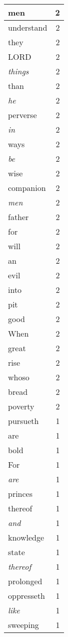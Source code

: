 \begin{center}
\begin{longtable}{l|r}
men & 2\\ \hline 
understand & 2\\ \hline 
they & 2\\ \hline 
LORD & 2\\ \hline 
\emph{things} & 2\\ \hline 
than & 2\\ \hline 
\emph{he} & 2\\ \hline 
perverse & 2\\ \hline 
\emph{in} & 2\\ \hline 
ways & 2\\ \hline 
\emph{be} & 2\\ \hline 
wise & 2\\ \hline 
companion & 2\\ \hline 
\emph{men} & 2\\ \hline 
father & 2\\ \hline 
for & 2\\ \hline 
will & 2\\ \hline 
an & 2\\ \hline 
evil & 2\\ \hline 
into & 2\\ \hline 
pit & 2\\ \hline 
good & 2\\ \hline 
When & 2\\ \hline 
great & 2\\ \hline 
rise & 2\\ \hline 
whoso & 2\\ \hline 
bread & 2\\ \hline 
poverty & 2\\ \hline 
pursueth & 1\\ \hline 
are & 1\\ \hline 
bold & 1\\ \hline 
For & 1\\ \hline 
\emph{are} & 1\\ \hline 
princes & 1\\ \hline 
thereof & 1\\ \hline 
\emph{and} & 1\\ \hline 
knowledge & 1\\ \hline 
state & 1\\ \hline 
\emph{thereof} & 1\\ \hline 
prolonged & 1\\ \hline 
oppresseth & 1\\ \hline 
\emph{like} & 1\\ \hline 
sweeping & 1\\ \hline 

\end{longtable}
\end{center}
